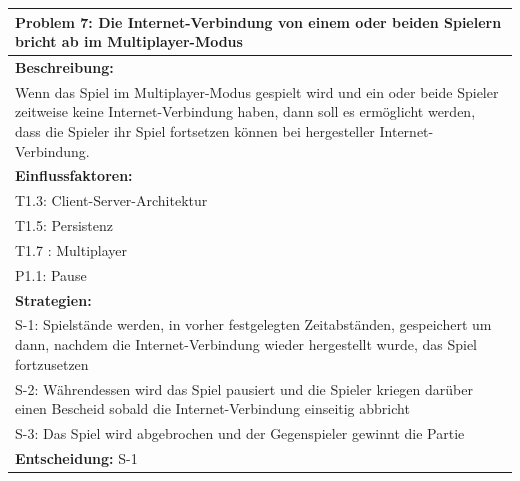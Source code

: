 \documentclass[fontsize=12pt,paper=a4,twoside]{scrartcl}
\begin{document}
\begin{longtable}{|p{15cm}|}
\hline
Problem 7: Die Internet-Verbindung von einem oder beiden Spielern bricht ab im Multiplayer-Modus                                                                        
\\ \hline                                                                                                                                                                                                                                                                                                                                                                                                                                                                                                                                                        
\textbf{Beschreibung:} \\
Wenn das Spiel im Multiplayer-Modus gespielt wird und ein oder beide Spieler zeitweise keine Internet-Verbindung haben, 
dann soll es ermöglicht werden, dass die Spieler ihr Spiel fortsetzen können bei hergesteller Internet-Verbindung. 
\\ \hline
\textbf{Einflussfaktoren:} \\
T1.3: Client-Server-Architektur \\
T1.5: Persistenz \\
T1.7 : Multiplayer \\
P1.1: Pause
\\ \hline
\textbf{Strategien:} \\
S-1: Spielstände werden, in vorher festgelegten Zeitabständen, gespeichert um dann, nachdem die Internet-Verbindung wieder hergestellt wurde, das Spiel fortzusetzen\\
S-2: Währendessen wird das Spiel pausiert und die Spieler kriegen darüber einen Bescheid sobald die Internet-Verbindung einseitig abbricht \\
S-3: Das Spiel wird abgebrochen und der Gegenspieler gewinnt die Partie
 \\ \hline
 \textbf{Entscheidung:} S-1
\\ \hline
\end{longtable}
\end{document}

